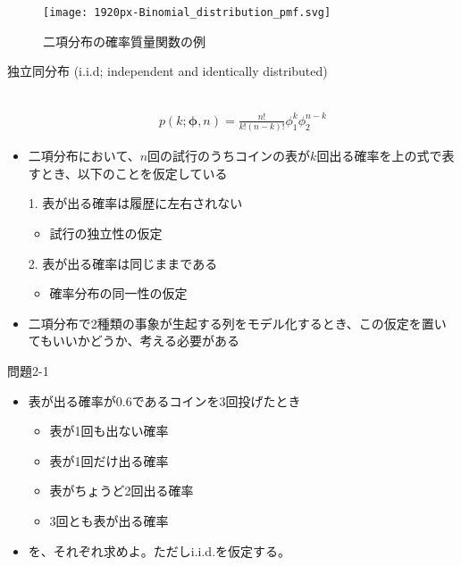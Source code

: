 \documentclass[aspectratio=169,unicode,dvipdfmx,14pt]{beamer}
\begin{document}
\begin{frame}
\begin{figure}[htbp]
\begin{center}
\vspace{.2in}
\texttt{[image: 1920px-Binomial\_distribution\_pmf.svg]}
\caption{二項分布の確率質量関数の例}
\label{}
\end{center}
\end{figure}
\end{frame}


\begin{frame}{独立同分布 {\normalsize (i.i.d; independent and identically distributed)}}
\begin{itemize}
\item[] \
\vspace{-.3in}
\begin{align}
p(k;\bm{\phi},n)=\frac{n!}{k!(n-k)!}\phi_1^k\phi_2^{n-k}
\end{align}
\item 二項分布において、$n$回の試行のうちコインの表が$k$回出る確率を上の式で表すとき、以下のことを仮定している
\item[1.] 表が出る確率は履歴に左右されない
\begin{itemize}
\item 試行の独立性の仮定
\end{itemize}
\item[2.] 表が出る確率は同じままである
\begin{itemize}
\item 確率分布の同一性の仮定
\end{itemize}
\item 二項分布で2種類の事象が生起する列をモデル化するとき、この仮定を置いてもいいかどうか、考える必要がある
\end{itemize}
\end{frame}

\begin{frame}{問題2-1}
\begin{itemize}
\item 表が出る確率が0.6であるコインを3回投げたとき
\begin{itemize}
\item 表が1回も出ない確率
\item 表が1回だけ出る確率
\item 表がちょうど2回出る確率
\item 3回とも表が出る確率
\end{itemize}
\item を、それぞれ求めよ。ただしi.i.d.を仮定する。
\end{itemize}
\end{frame}
\end{document}
